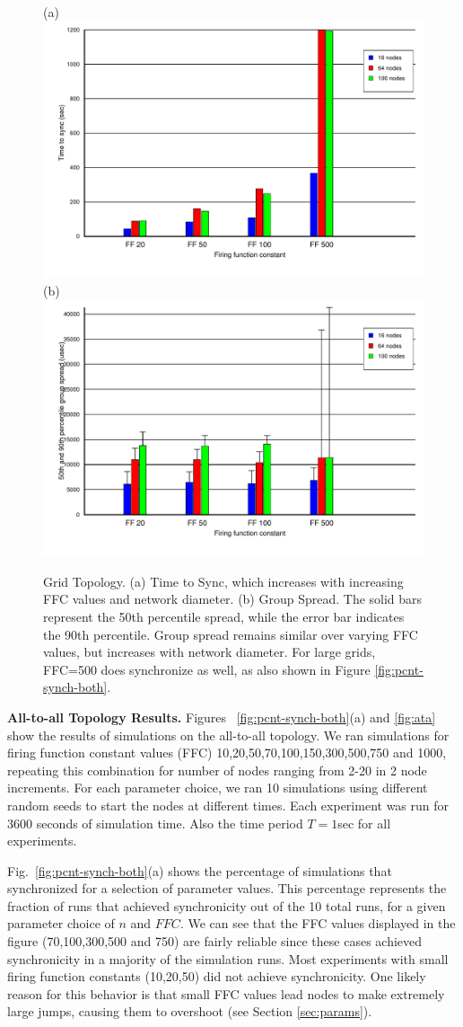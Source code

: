 \begin{figure}
\begin{center}
(a)
\includegraphics[width=0.4\hsize]{./figures/mdw/grid/tts.pdf}
(b)
\includegraphics[width=0.4\hsize]{./figures/mdw/grid/gs-grid.pdf}
\end{center}
\caption{Grid Topology. (a) Time to Sync, which increases with
increasing FFC values and network diameter. (b) Group Spread. The
solid bars represent the 50th percentile spread, while the error bar
indicates the 90th percentile. Group spread remains similar over
varying FFC values, but increases with network diameter. For large
grids, FFC=500 does synchronize as well, as also shown in Figure
\ref{fig:pcnt-synch-both}.}
\label{fig:grid}
\end{figure}

{\bf All-to-all Topology Results.}  Figures
~\ref{fig:pcnt-synch-both}(a) and \ref{fig:ata} show the results of
simulations on the all-to-all topology. We ran simulations for firing
function constant values (FFC) 10,20,50,70,100,150,300,500,750 and
1000, repeating this combination for number of nodes ranging from 2-20
in 2 node increments. For each parameter choice, we ran 10 simulations
using different random seeds to start the nodes at different
times. Each experiment was run for 3600 seconds of simulation
time. Also the time period $T=1$sec for all experiments.

Fig.~\ref{fig:pcnt-synch-both}(a) shows the percentage of simulations
that synchronized for a selection of parameter values. This percentage
represents the fraction of runs that achieved synchronicity out of the
10 total runs, for a given parameter choice of $n$ and $FFC$.  We can
see that the FFC values displayed in the figure (70,100,300,500 and
750) are fairly reliable since these cases achieved synchronicity in a
majority of the simulation runs.  Most experiments with small firing
function constants (10,20,50) did not achieve synchronicity. One
likely reason for this behavior is that small FFC values lead nodes to
make extremely large jumps, causing them to overshoot (see Section
\ref{sec:params}).

